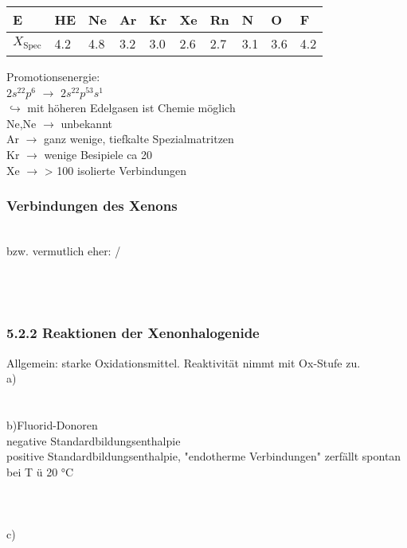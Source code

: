 \documentclass{article}
\begin{document}
\begin{tabular}{l|llllll|lll}
    \hline
    E&HE&Ne&Ar&Kr&Xe&Rn&N&O&F\\
    \hline
    $X_{\mathrm{Spec}}$&4.2&4.8&3.2&3.0&2.6&2.7&3.1&3.6&4.2\\
\end{tabular}
Promotionsenergie:\\
$2s^22p^6$ $\rightarrow$ $2s^22p^53s^1$\\
$\hookrightarrow$ mit höheren Edelgasen ist Chemie möglich\\
Ne,Ne $\rightarrow$ unbekannt\\
Ar $\rightarrow$ ganz wenige, tiefkalte Spezialmatritzen\\
Kr $\rightarrow$ wenige Besipiele ca 20\\
Xe $\rightarrow$ > 100 isolierte Verbindungen\\
\subsubsection{Verbindungen des Xenons}
\\
 bzw. vermutlich eher: \ce{[XeF]^+ [PtF5]^-} / \ce{[XeF]^+[Pt2F11]}\\\\
\\
\\

\subsubsection{5.2.2 Reaktionen der Xenonhalogenide}
Allgemein:  starke Oxidationsmittel. Reaktivität nimmt mit Ox-Stufe zu.\\
a)
\\
\\
\\
b)Fluorid-Donoren\\
 negative Standardbildungsenthalpie\\
 positive Standardbildungsenthalpie, "endotherme Verbindungen" zerfällt spontan bei T ü 20 °C\\
\\
\\
\\
c)\\
\end{document}
